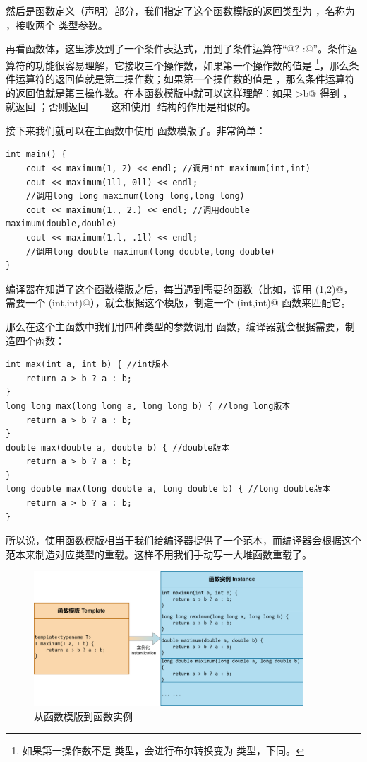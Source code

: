 然后是函数定义（声明）部分，我们指定了这个函数模版的返回类型为 \lstinline@T@，名称为 \lstinline@maximum@，接收两个 \lstinline@T@ 类型参数。\par
再看函数体，这里涉及到了一个条件表达式，用到了条件运算符``@? :@''。条件运算符的功能很容易理解，它接收三个操作数，如果第一个操作数的值是 \lstinline@true@\footnote{如果第一操作数不是 \lstinline@bool@ 类型，会进行布尔转换变为 \lstinline@bool@ 类型，下同。}，那么条件运算符的返回值就是第二操作数；如果第一个操作数的值是 \lstinline@false@，那么条件运算符的返回值就是第三操作数。在本函数模版中就可以这样理解：如果 \lstinline@a>b@ 得到 \lstinline@true@，就返回 \lstinline@a@；否则返回 \lstinline@b@——这和使用 \lstinline@if@-\lstinline@else@ 结构的作用是相似的。\par
接下来我们就可以在主函数中使用 \lstinline@maximum@ 函数模版了。非常简单：
\begin{lstlisting}
int main() {
    cout << maximum(1, 2) << endl; //调用int maximum(int,int)
    cout << maximum(1ll, 0ll) << endl;
    //调用long long maximum(long long,long long)
    cout << maximum(1., 2.) << endl; //调用double maximum(double,double)
    cout << maximum(1.l, .1l) << endl;
    //调用long double maximum(long double,long double)
}
\end{lstlisting}
编译器在知道了这个函数模版之后，每当遇到需要的函数（比如，调用 \lstinline@maximum(1,2)@，需要一个 \lstinline@maximum(int,int)@），就会根据这个模版，制造一个 \lstinline@maximum(int,int)@ 函数来匹配它。\par
那么在这个主函数中我们用四种类型的参数调用 \lstinline@maximum@ 函数，编译器就会根据需要，制造四个函数：
\begin{lstlisting}
int max(int a, int b) { //int版本
    return a > b ? a : b;
}
long long max(long long a, long long b) { //long long版本
    return a > b ? a : b;
}
double max(double a, double b) { //double版本
    return a > b ? a : b;
}
long double max(long double a, long double b) { //long double版本
    return a > b ? a : b;
}
\end{lstlisting}\par
所以说，使用函数模版相当于我们给编译器提供了一个范本，而编译器会根据这个范本来制造对应类型的重载。这样不用我们手动写一大堆函数重载了。\par
\begin{figure}[htbp]
    \centering
    \includegraphics[width=0.9\textwidth]{.//images/generalized_parts/04_function_template_and_instance_300.png}
    \caption{从函数模版到函数实例}
\end{figure}
